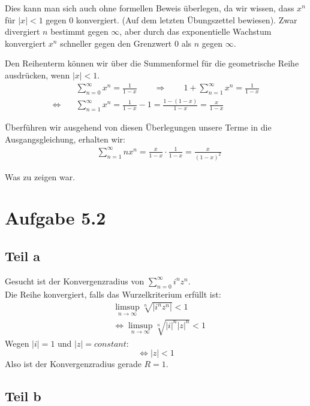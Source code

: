 \documentclass[a4paper,german,12pt,smallheadings]{scrartcl}
\begin{document}
Dies kann man sich auch ohne formellen Beweis überlegen, da wir wissen, dass
$x^n$ für $|x|<1$ gegen 0 konvergiert. (Auf dem letzten Übungszettel bewiesen).
Zwar divergiert $n$ bestimmt gegen $\infty$, aber durch das exponentielle
Wachstum konvergiert $x^n$ schneller gegen den Grenzwert 0 als $n$ gegen
$\infty$.

Den Reihenterm können wir über die Summenformel für die geometrische Reihe ausdrücken, wenn $|x| < 1$.
\begin{align*}
  &\sum_{n=0}^\infty x^n = \frac{1}{1-x} \qquad\Rightarrow\qquad 1 + \sum_{n=1}^\infty x^n= \frac{1}{1-x}\\ 
  \Leftrightarrow\quad & \sum_{n=1}^\infty x^n =\frac{1}{1-x} - 1 = \frac{1-\left(1-x\right)}{1-x}= \frac{x}{1-x}
\end{align*}


Überführen wir ausgehend von diesen Überlegungen unsere Terme in die Ausgangsgleichung, erhalten wir:
\begin{align*}
  &\sum_{n=1}^\infty nx^n = \frac{x}{1-x} \cdot \frac{1}{1-x} = \frac{x}{(1-x)^2}
\end{align*}

Was zu zeigen war.

\section*{Aufgabe 5.2}
\subsection*{Teil a}

Gesucht ist der Konvergenzradius von $\sum\limits_{n=0}^{\infty} i^nz^n$.\\
Die Reihe konvergiert, falls das Wurzelkriterium erfüllt ist:
\begin{align*}
  & \limsup\limits_{n \to \infty} \sqrt[n]{|i^nz^n|}<1\\
  & \Leftrightarrow \limsup\limits_{n \to \infty} \sqrt[n]{|i|^n|z|^n}<1
\end{align*}
Wegen $|i|=1$ und $|z|=constant$:
\begin{equation*}
\Leftrightarrow |z|<1
\end{equation*}
Also ist der Konvergenzradius gerade $R=1$.

\subsection*{Teil b}
\end{document}
